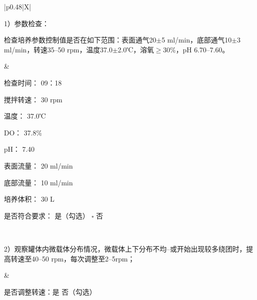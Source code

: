 \documentclass[UTF8,10pt,a4paper,fontset=fandol]{ctexart}
\newcommand{\fieldvalue}[1]{#1}
\newcommand{\handwritten}[1]{#1}
\begin{document}
\begin{tabularx}{\textwidth}{|p{0.48\textwidth}|X|}
\hline
\begin{minipage}[t]{\linewidth}
1）参数检查：

检查培养参数控制值是否在如下范围：表面通气20$\pm$5 ml/min，底部通气10$\pm$3 ml/min，转速35--50 rpm，温度37.0$\pm$2.0℃，溶氧$\geq$30\%，pH 6.70--7.60。
\end{minipage}
&
\begin{minipage}[t]{\linewidth}
检查时间：
\fieldvalue{\handwritten{09：18}}

\vspace{2pt}
搅拌转速：
\fieldvalue{\handwritten{30 rpm}}

\vspace{2pt}
温度：
\fieldvalue{\handwritten{37.0℃}}

\vspace{2pt}
DO：
\fieldvalue{\handwritten{37.8\%}}

\vspace{2pt}
pH：
\fieldvalue{\handwritten{7.40}}

\vspace{2pt}
表面流量：
\fieldvalue{\handwritten{20}} ml/min

\vspace{2pt}
底部流量：
\fieldvalue{\handwritten{10}} ml/min

\vspace{2pt}
培养体积：
\fieldvalue{\handwritten{30}} L

\vspace{2pt}
是否符合要求： 
\fieldvalue{\handwritten{是（勾选）}} \quad $\square$ 否
\end{minipage}
\\
\hline
\begin{minipage}[t]{\linewidth}
2）观察罐体内微载体分布情况，微载体上下分布不均--或开始出现较多绕团时，提高转速至40--50 rpm，每次调整至2--5rpm；
\end{minipage}
&
\begin{minipage}[t]{\linewidth}
是否调整转速：是 \quad
\fieldvalue{\handwritten{否（勾选）}}


\end{minipage}
\end{tabularx}
\end{document}
